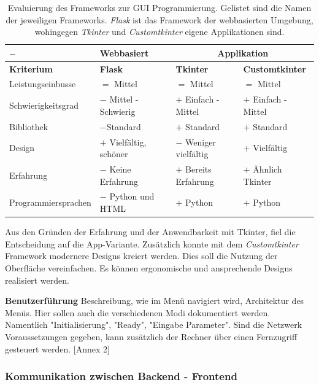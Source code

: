 \begin{table}[H]
    \centering
    \begin{tabular}{l|l|l|l}
        $-$&                        \textbf{Webbasiert}&        \multicolumn{2}{c}{\textbf{Applikation}}\\
        \hline
        \textbf{Kriterium}&         \textbf{Flask}&             \textbf{Tkinter}&           \textbf{Customtkinter}\\
        \hline
        Leistungseinbusse&          $=$ Mittel&                 $=$ Mittel&                 $=$ Mittel\\
        Schwierigkeitsgrad&         $-$ Mittel - Schwierig&     $+$ Einfach - Mittel &      $+$ Einfach - Mittel \\
        Bibliothek&                 $-$Standard&                $+$ Standard &              $+$ Standard \\
        Design&                     $+$ Vielfältig, schöner&    $-$ Weniger vielfältig &    $+$ Vielfältig\\
        Erfahrung&                  $-$ Keine Erfahrung&        $+$ Bereits Erfahrung &     $+$ Ähnlich Tkinter\\
        Programmiersprachen&        $-$ Python und HTML&        $+$ Python &                $+$ Python \\
    \end{tabular}
    \caption{Evaluierung des Frameworks zur GUI Programmierung. Gelistet sind die Namen der jeweiligen Frameworks. \textit{Flask} ist das Framework der webbasierten Umgebung, wohingegen \textit{Tkinter} und \textit{Customtkinter} eigene Applikationen sind.}
    \label{tab:gui_programming}
\end{table}

Aus den Gründen der Erfahrung und der Anwendbarkeit mit Tkinter, fiel die Entscheidung auf die App-Variante. Zusätzlich konnte mit dem \textit{Customtkinter} Framework modernere Designs kreiert werden. Dies soll die Nutzung der Oberfläche vereinfachen. Es können ergonomische und ansprechende Designs realisiert werden.

\textbf{Benutzerführung}
Beschreibung, wie im Menü navigiert wird, Architektur des Menüs. Hier sollen auch die verschiedenen Modi dokumentiert werden. Namentlich "Initialisierung", "Ready", "Eingabe Parameter". Sind die Netzwerk Voraussetzungen gegeben,  kann zusätzlich der Rechner über einen Fernzugriff gesteuert werden. [Annex 2]

\subsubsection{Kommunikation zwischen Backend - Frontend}

